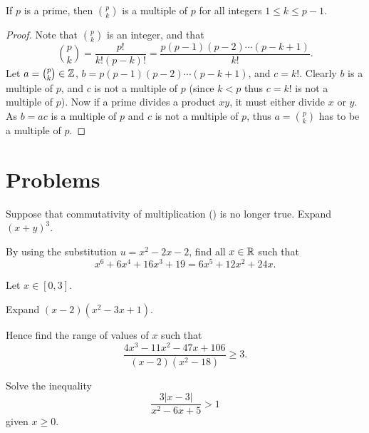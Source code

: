 \newpage

\begin{proposition}\label{prop-binomial-coefficient-multiple-of-p}
    If $p$ is a prime, then $p\choose k$ is a multiple of $p$ for all integers $1 \leq k \leq p - 1$.
\end{proposition}
\begin{proof}
    Note that $p \choose k$ is an integer, and that
    \[
        {p \choose k} = \frac{p!}{k!(p-k)!} = \frac{p(p-1)(p-2)\cdots(p-k+1)}{k!}.
    \]
    Let $a = {p \choose k} \in \mathbb{Z}$, $b = p(p-1)(p-2)\cdots(p-k+1)$, and $c = k!$. Clearly $b$ is a multiple of $p$, and $c$ is not a multiple of $p$ (since $k < p$ thus $c = k!$ is not a multiple of $p$). Now if a prime divides a product $xy$, it must either divide $x$ or $y$. As $b = ac$ is a multiple of $p$ and $c$ is not a multiple of $p$, thus $a = {p \choose k}$ has to be a multiple of $p$.
\end{proof}

\newpage

\section{Problems}
\begin{problem}
    Suppose that commutativity of multiplication () is no longer true. Expand $(x+y)^3$.
\end{problem}

\begin{problem}
    By using the substitution $u = x^2 - 2x - 2$, find all $x \in \mathbb{R}$ such that
    \[
        x^6 + 6x^4 + 16x^3 + 19 = 6x^5 + 12x^2 + 24x.
    \]
\end{problem}

\begin{problem}
    Let $x \in [0,3]$.
    \begin{partquestions}{\roman*}
        \item Expand $(x-2)(x^2-3x+1)$.
        \item Hence find the range of values of $x$ such that
        \[
            \frac{4x^3 - 11x^2 - 47x + 106}{(x-2)(x^2-18)} \geq 3.
        \]
    \end{partquestions}
\end{problem}

\begin{problem}
    Solve the inequality
    \[
        \frac{3|x-3|}{x^2-6x+5} > 1
    \]
    given $x \geq 0$.
\end{problem}

